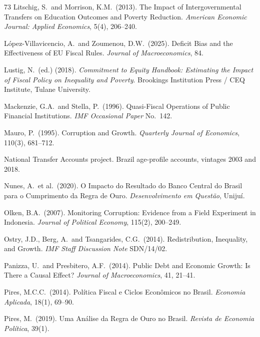 \documentclass[11pt,a4paper]{article}
\begin{document}
\begin{thebibliography}{73}
 Litschig, S.\ and Morrison, K.M.\ (2013). The Impact of Intergovernmental Transfers on Education Outcomes and Poverty Reduction. \textit{American Economic Journal: Applied Economics}, 5(4), 206--240.

 L\'opez-Villavicencio, A.\ and Zoumenou, D.W.\ (2025). Deficit Bias and the Effectiveness of EU Fiscal Rules. \textit{Journal of Macroeconomics}, 84.

 Lustig, N.\ (ed.) (2018). \textit{Commitment to Equity Handbook: Estimating the Impact of Fiscal Policy on Inequality and Poverty}. Brookings Institution Press / CEQ Institute, Tulane University.

 Mackenzie, G.A.\ and Stella, P.\ (1996). Quasi-Fiscal Operations of Public Financial Institutions. \textit{IMF Occasional Paper} No.\ 142.

 Mauro, P.\ (1995). Corruption and Growth. \textit{Quarterly Journal of Economics}, 110(3), 681--712.

 National Transfer Accounts project. Brazil age-profile accounts, vintages 2003 and 2018.

 Nunes, A.\ et al.\ (2020). O Impacto do Resultado do Banco Central do Brasil para o Cumprimento da Regra de Ouro. \textit{Desenvolvimento em Quest\~ao}, Unijuí.

 Olken, B.A.\ (2007). Monitoring Corruption: Evidence from a Field Experiment in Indonesia. \textit{Journal of Political Economy}, 115(2), 200--249.

 Ostry, J.D., Berg, A.\ and Tsangarides, C.G.\ (2014). Redistribution, Inequality, and Growth. \textit{IMF Staff Discussion Note} SDN/14/02.

 Panizza, U.\ and Presbitero, A.F.\ (2014). Public Debt and Economic Growth: Is There a Causal Effect? \textit{Journal of Macroeconomics}, 41, 21--41.

 Pires, M.C.C.\ (2014). Pol\'itica Fiscal e Ciclos Econ\^omicos no Brasil. \textit{Economia Aplicada}, 18(1), 69--90.

 Pires, M.\ (2019). Uma An\'alise da Regra de Ouro no Brasil. \textit{Revista de Economia Pol\'itica}, 39(1).


\end{thebibliography}
\end{document}
